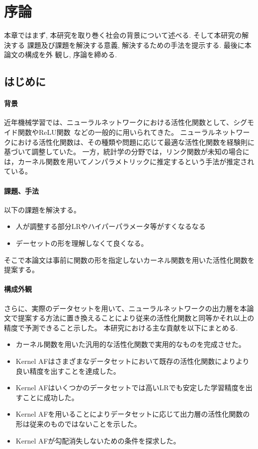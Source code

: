 \chapter{序論}
\label{introduction}

本章ではまず, 本研究を取り巻く社会の背景について述べる. そして本研究の解決する
課題及び課題を解決する意義, 解決するための手法を提示する. 最後に本論文の構成を外
観し, 序論を締める.

\section{はじめに}
\label{introduction:background}

\subsubsection{背景}
近年機械学習では、ニューラルネットワークにおける活性化関数として、シグモイド関数やReLU関数~\cite{ReLU}などの一般的に用いられてきた。
ニューラルネットワークにおける活性化関数は、その種類や問題に応じて最適な活性化関数を経験則に基づいて調整していた。
一方，統計学の分野では，リンク関数が未知の場合には，カーネル関数を用いてノンパラメトリックに推定するという手法が推定されている。

\subsubsection{課題、手法}
以下の課題を解決する。
\begin{itemize}
  \item 人が調整する部分LRやハイパーパラメータ等がすくなるなる
  \item デーセットの形を理解しなくて良くなる。
\end{itemize}
そこで本論文は事前に関数の形を指定しないカーネル関数を用いた活性化関数を提案する。

\subsubsection{構成外観}

さらに、実際のデータセットを用いて、ニューラルネットワークの出力層を本論文で提案する方法に置き換えることにより従来の活性化関数と同等かそれ以上の精度で予測できること示した。
本研究における主な貢献を以下にまとめる.

\begin{itemize}
  \item カーネル関数を用いた汎用的な活性化関数で実用的なものを完成させた。
  \item Kernel AFはさまざまなデータセットにおいて既存の活性化関数によりより良い精度を出すことを達成した。
  \item Kernel AFはいくつかのデータセットでは高いLRでも安定した学習精度を出すことに成功した。
  \item Kernel AFを用いることによりデータセットに応じて出力層の活性化関数の形は従来のものではないことを示した。
  \item Kernel AFが勾配消失しないための条件を探求した。
\end{itemize}


